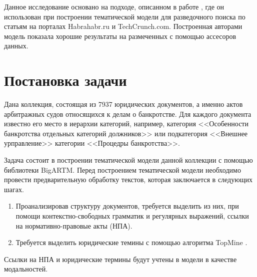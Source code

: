 \documentclass[12pt]{article}
\begin{document}







Данное исследование основано на подходе, описанном в работе \cite{Ianina_2017}, где он использован при построении тематической модели для разведочного поиска по статьям на порталах Habrahabr.ru и TechCrunch.com. Построенная авторами модель показала хорошие результаты на размеченных с помощью ассесоров данных.

\section{Постановка задачи}

Дана коллекция, состоящая из 7937 юридических документов, а именно актов арбитражных судов относящихся к делам о банкротстве. Для каждого документа известно его место в иерархии категорий, например, категория <<Особенности банкротства отдельных категорий должников>> или подкатегория <<Внешнее урправление>>  категории <<Процедры банкротства>>.

Задача состоит в построении тематической модели данной коллекции с помощью библиотеки BigARTM. Перед построением тематической модели необходимо провести предварительную обработку текстов, которая заключается в следующих шагах.
\begin{enumerate} 
  \item Проанализировав структуру документов, требуется выделить из них, при помощи контекстно-свободных грамматик и регулярных выражений, ссылки на нормативно-правовые акты (НПА).
  \item Требуется выделить юридические темины с помощью алгоритма TopMine \cite{El-Kishky2014}.
\end{enumerate}
Ссылки на НПА и юридические термины будут учтены в модели в качестве модальностей.
\end{document}
